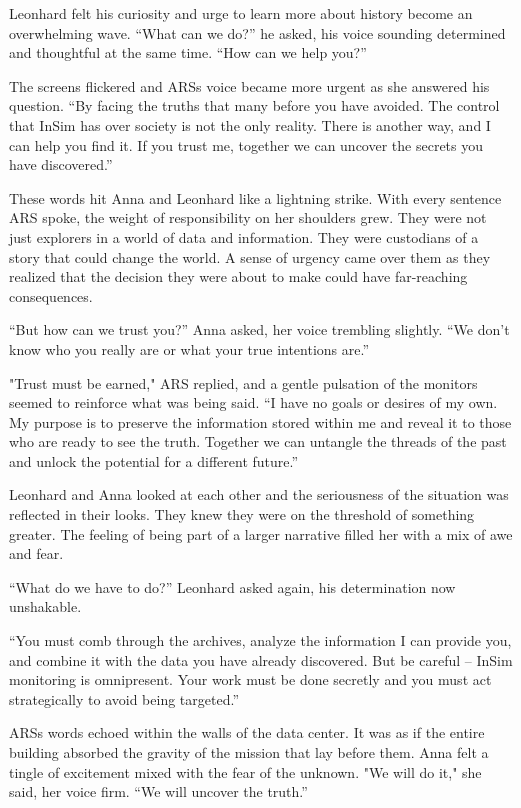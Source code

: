 \documentclass[
]{article}
\begin{document}
Leonhard felt his curiosity and urge to learn more about history become
an overwhelming wave. ``What can we do?'' he asked, his voice sounding
determined and thoughtful at the same time. ``How can we help you?''

The screens flickered and ARS\textquotesingle s voice became more urgent
as she answered his question. ``By facing the truths that many before
you have avoided. The control that InSim has over society is not the
only reality. There is another way, and I can help you find it. If you
trust me, together we can uncover the secrets you have discovered.''

These words hit Anna and Leonhard like a lightning strike. With every
sentence ARS spoke, the weight of responsibility on her shoulders grew.
They were not just explorers in a world of data and information. They
were custodians of a story that could change the world. A sense of
urgency came over them as they realized that the decision they were
about to make could have far-reaching consequences.

``But how can we trust you?'' Anna asked, her voice trembling slightly.
``We don't know who you really are or what your true intentions are.''

"Trust must be earned," ARS replied, and a gentle pulsation of the
monitors seemed to reinforce what was being said. ``I have no goals or
desires of my own. My purpose is to preserve the information stored
within me and reveal it to those who are ready to see the truth.
Together we can untangle the threads of the past and unlock the
potential for a different future.''

Leonhard and Anna looked at each other and the seriousness of the
situation was reflected in their looks. They knew they were on the
threshold of something greater. The feeling of being part of a larger
narrative filled her with a mix of awe and fear.

``What do we have to do?'' Leonhard asked again, his determination now
unshakable.

``You must comb through the archives, analyze the information I can
provide you, and combine it with the data you have already discovered.
But be careful -- InSim monitoring is omnipresent. Your work must be
done secretly and you must act strategically to avoid being targeted.''

ARS\textquotesingle s words echoed within the walls of the data center.
It was as if the entire building absorbed the gravity of the mission
that lay before them. Anna felt a tingle of excitement mixed with the
fear of the unknown. "We will do it," she said, her voice firm. ``We
will uncover the truth.''
\end{document}
